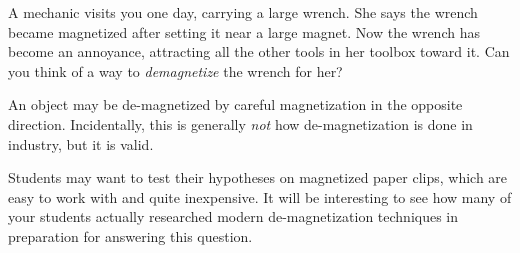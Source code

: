 

A mechanic visits you one day, carrying a large wrench.  She says the wrench became magnetized after setting it near a large magnet.  Now the wrench has become an annoyance, attracting all the other tools in her toolbox toward it.  Can you think of a way to {\it demagnetize} the wrench for her?







An object may be de-magnetized by careful magnetization in the opposite direction.  Incidentally, this is generally {\it not} how de-magnetization is done in industry, but it is valid.







Students may want to test their hypotheses on magnetized paper clips, which are easy to work with and quite inexpensive.  It will be interesting to see how many of your students actually researched modern de-magnetization techniques in preparation for answering this question.




